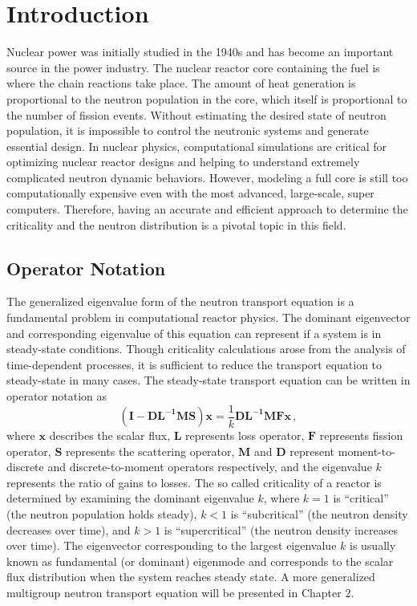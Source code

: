 \cleardoublepage

\chapter{Introduction}
\label{chapter:intro}
Nuclear power was initially studied in the 1940s and has become an important source in the power industry.
The nuclear reactor core containing the fuel is where the chain reactions take place.
The amount of heat generation is proportional to the neutron population in the core, which itself is proportional to the number of fission events. 
Without estimating the desired state of neutron population, it is impossible to control the neutronic systems and generate essential design. 
In nuclear physics, computational simulations are critical for optimizing nuclear reactor designs and helping to understand extremely complicated neutron dynamic behaviors.
However, modeling a full core is still too computationally expensive even with the most advanced, large-scale, super computers. 
Therefore, having an accurate and efficient approach to determine the criticality and the neutron distribution is a pivotal topic in this field.

\section{Operator Notation}
The generalized eigenvalue form of the neutron transport equation is a fundamental problem in computational reactor physics.
The dominant eigenvector and corresponding eigenvalue of this equation can represent if a system is in steady-state conditions.
Though criticality calculations arose from the analysis of time-dependent processes, it is sufficient to reduce the transport equation to steady-state in many cases. 
The steady-state transport equation can be written in operator notation as
\begin{equation}
 \mathbf{(I - DL^{-1}MS)} \mathbf{\mathbf{x}} = \frac{1}{k} \mathbf{DL^{-1}MF} \mathbf{\mathbf{x}}  \, ,
 \label{eq:keig}
\end{equation}
where $\mathbf{\mathbf{x}} $ describes the scalar flux, $\mathbf{L}$ represents loss operator,  $\mathbf{F}$ represents fission operator, $\mathbf{S}$ represents the scattering operator, $\mathbf{M}$ and $\mathbf{D}$ represent moment-to-discrete and discrete-to-moment operators respectively, and the eigenvalue $k$ represents the ratio of gains to losses.
The so called criticality of a reactor is determined by examining the dominant eigenvalue $k$, where $k=1$ is ``critical'' (the neutron population holds steady), $k<1$ is ``subcritical'' (the neutron density decreases over time), and $k > 1$ is ``supercritical'' (the neutron density increases over time).
The eigenvector corresponding to the largest eigenvalue $k$ is usually known as fundamental (or dominant) eigenmode and corresponds to the scalar flux distribution when the system reaches steady state.
A more generalized multigroup neutron transport equation will be presented in Chapter 2.

